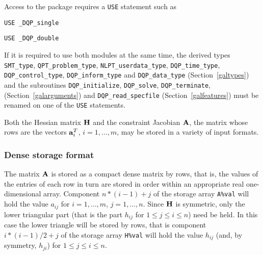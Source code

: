 \documentclass{galahad}
\newcommand{\packagename}{DQP}
\newcommand{\fullpackagename}{\libraryname\_\packagename}
\begin{document}
\galhowto


Access to the package requires a {\tt USE} statement such as

\medskip{}

\hspace{8mm} {\tt USE \fullpackagename\_single}

\medskip{}

\hspace{8mm} {\tt USE  \fullpackagename\_double}

\medskip

\noindent
If it is required to use both modules at the same time, the derived types
{\tt SMT\_type},
{\tt QPT\_problem\_type},
{\tt NLPT\_userdata\-\_type},
{\tt \packagename\_time\_type},
{\tt \packagename\_control\_type},
{\tt \packagename\_inform\_type}
and
{\tt \packagename\_data\_type}
(Section~\ref{galtypes})
and the subroutines
{\tt \packagename\_initialize},
{\tt \packagename\_\-solve},
{\tt \packagename\_terminate},
(Section~\ref{galarguments})
and
{\tt \packagename\_read\_specfile}
(Section~\ref{galfeatures})
must be renamed on one of the {\tt USE} statements.


\galmatrix
Both the Hessian matrix ${\mathbf{H}}$ and
the constraint Jacobian ${\mathbf{A}}$, the matrix
whose rows are the vectors ${\mathbf{a}}_{i}^{T}$, $i = 1, \ldots , m$,
may be stored in a variety of input formats.

\subsubsection{Dense storage format}\label{dense}
The matrix ${\mathbf{A}}$ is stored as a compact
dense matrix by rows, that is, the values of the entries of each row in turn are
stored in order within an appropriate real one-dimensional array.
Component $n \ast (i-1) + j$ of the storage array {\tt A\%val} will hold the
value $a_{ij}$ for $i = 1, \ldots , m$, $j = 1, \ldots , n$.
Since ${\mathbf{H}}$ is symmetric, only the lower triangular part (that is the part
$h_{ij}$ for $1 \leq j \leq i \leq n$) need be held. In this case
the lower triangle will be stored by rows, that is
component $i \ast (i-1)/2 + j$ of the storage array {\tt H\%val}
will hold the value $h_{ij}$ (and, by symmetry, $h_{ji}$)
for $1 \leq j \leq i \leq n$.
\end{document}

